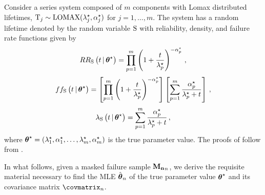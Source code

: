 \documentclass[
    11pt,
    extrafontsizes,
    article,
    oldfontcommands,
    final,
    oneside,
    openany,
    hidelinks]{memoir}
\begin{document}
Consider a series system composed of $m$ components with Lomax distributed lifetimes, $\mathrm{T}_j \sim \text{LOMAX}({\lambda}^{\star}_j, {\alpha}^{\star}_j)$ for $j=1,\ldots,m$. The system has a random lifetime denoted by the random variable $\mathrm{S}$ with reliability, density, and failure rate functions given by
\begin{equation}
\label{eq:sys_pareto_reliability_function}
R{R_{\mathrm{S}}} \left ( t {\,|\,} {\boldsymbol{\mathbf{\theta}}}^{\star} \right ) =
    \prod_{p=1}^{m} \left (1 + \frac{t}{{\lambda}^{\star}_p} \right )^{-{\alpha}^{\star}_p}\,,
\end{equation}
\begin{equation}
\label{eq:sys_pareto_pdf_function}
f{f_{\mathrm{S}}} \left ( t {\,|\,} {\boldsymbol{\mathbf{\theta}}}^{\star} \right ) =
    \left [ \prod_{p=1}^{m} \left (1 + \frac{t}{{\lambda}^{\star}_p} \right )^{-{\alpha}^{\star}_p} \right ]
    \left [ \sum_{p=1}^{m} \frac{{\alpha}^{\star}_p}{{\lambda}^{\star}_p + t} \right ]\,,
\end{equation}
\begin{equation}
\label{eq:sys_pareto_failure_rate_function}
\lambda_{\mathrm{S}} \left ( t {\,|\,} {\boldsymbol{\mathbf{\theta}}}^{\star} \right ) = 
    \sum_{p=1}^{m} \frac{{\alpha}^{\star}_p}{{\lambda}^{\star}_p + t}\,,
\end{equation}
where ${\boldsymbol{\mathbf{\theta}}}^{\star} = \left ({\lambda}^{\star}_1, {\alpha}^{\star}_1, \ldots, {\lambda}^{\star}_m, {\alpha}^{\star}_m \right )$ is the true parameter value. The proofs of  follow from .

In what follows, given a masked failure sample $\boldsymbol{\mathbf{M_n}}_n$, we derive the requisite material necessary to find the MLE $\hat{\boldsymbol{\mathbf{\theta}}}_n$ of the true parameter value ${\boldsymbol{\mathbf{\theta}}}^{\star}$ and its covariance matrix $\covmatrix_n$. 
\end{document}
